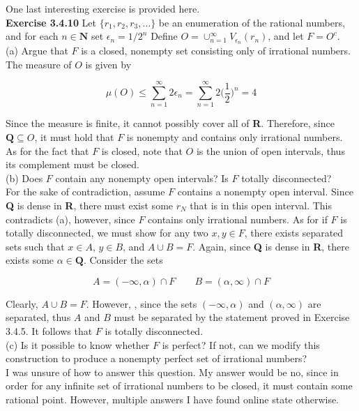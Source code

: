 \documentclass[12pt, letterpaper, twoside]{article}
\newcommand{\N}{\textbf{N}}
\newcommand{\R}{\textbf{R}}
\newcommand{\Q}{\textbf{Q}}
\begin{document}
One last interesting exercise is provided here. \\

\textbf{Exercise 3.4.10} Let $\{r_1, r_2, r_3, \dots \}$ be an enumeration of the rational numbers,
and for each $n \in \N$ set $\epsilon_n = 1/2^n$ Define $O = \cup_{n=1}^\infty V_{\epsilon_n} (r_n)$, and let $F = O^c$. \\

(a) Argue that $F$ is a closed, nonempty set consisting only of irrational
numbers. \\

The measure of $O$ is given by 

$$
\mu(O) \leq \sum_{n=1}^\infty 2\epsilon_n = \sum_{n=1}^\infty 2 \bigg(\frac{1}{2}\bigg)^n = 4
$$

Since the measure is finite, it cannot possibly cover all of \R. Therefore, since $\Q \subseteq O$, it must hold that $F$ is nonempty and contains only irrational numbers. As for the fact that $F$ is closed, note that $O$ is the union of open intervals, thus its complement must be closed. \\

(b) Does $F$ contain any nonempty open intervals? Is $F$ totally disconnected? \\

For the sake of contradiction, assume $F$ contains a nonempty open interval. Since \textbf{Q} is dense in \R, there must exist some $r_N$ that is in this open interval. This contradicts (a), however, since $F$ contains only irrational numbers. As for if $F$ is totally disconnected, we must show for any two $x, y \in F$, there exists separated sets such that $x \in A$, $y \in B$, and $A \cup B = F$. Again, since \textbf{Q} is dense in \R, there exists some $\alpha \in \Q$. Consider the sets

$$
A = (-\infty, \alpha) \cap F \qquad        B = (\alpha, \infty) \cap F
$$

Clearly, $A \cup B = F$. However, , since the sets $(-\infty, \alpha)$ and $(\alpha, \infty)$ are separated, thus $A$ and $B$ must be separated by the statement proved in Exercise 3.4.5. It follows that $F$ is totally disconnected. \\

(c) Is it possible to know whether $F$ is perfect? If not, can we modify this
construction to produce a nonempty perfect set of irrational numbers? \\

I was unsure of how to answer this question. My answer would be no, since in order for any infinite set of irrational numbers to be closed, it must contain some rational point. However, multiple answers I have found online state otherwise. 
\end{document}
